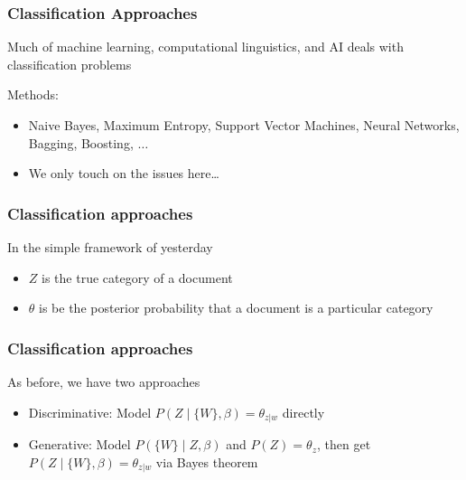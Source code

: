 \documentclass[11pt,compress,professionalfonts]{beamer}
\newcommand{\ita}{\begin{itemize}}
\newcommand{\itm}{\item[]}
\newcommand{\itz}{\end{itemize}}
\begin{document}
\begin{frame}[t,fragile]\frametitle{Classification Approaches}

Much of machine learning, computational linguistics, and AI deals with classification problems

Methods:
\ita
\itm Naive Bayes, Maximum Entropy, Support Vector Machines, Neural Networks, Bagging, Boosting, $\ldots$
\itm We only touch on the issues here\ldots
\itz

\end{frame}
\begin{frame}[t,fragile]\frametitle{Classification approaches}

In the simple framework of yesterday
\ita
\itm $Z$ is the true category of a document
\itm $\theta$ is be the posterior probability that a document is a particular category
\itz

\end{frame}
\begin{frame}[t,fragile]\frametitle{Classification approaches}

As before, we have two approaches
\ita
\itm Discriminative: Model $P(Z \mid \{W\}, \beta) = \theta_{z|w}$ directly
\itm Generative: Model $P(\{W\} \mid Z, \beta)$ and $P(Z)=\theta_z$, then get $P(Z \mid \{W\}, \beta) = \theta_{z|w}$ via Bayes theorem
\itz

\end{frame}
\end{document}
